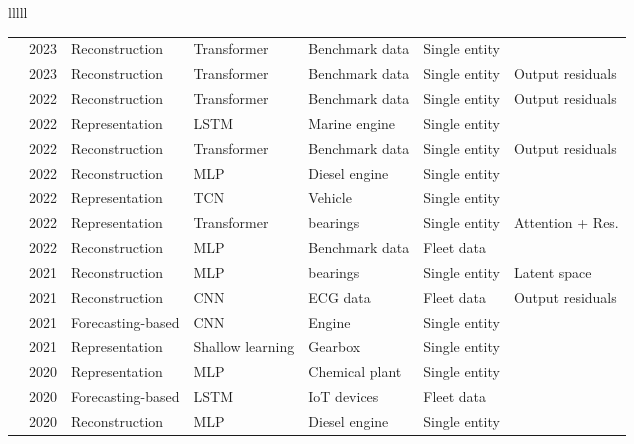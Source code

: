 \begin{landscape}
\begin{longtable}{lllll}
\begin{tabular}{lllllll}
\cite{liDCTGANDilatedConvolutional2023} & 2023 & Reconstruction & Transformer & Benchmark data & Single entity & \texttimes \\
\cite{wuDecomposeAutoTransformerTime2023} & 2023 & Reconstruction & Transformer & Benchmark data & Single entity & Output residuals \\
\cite{xuAnomalyTransformerTime2022} & 2022 & Reconstruction & Transformer & Benchmark data & Single entity & Output residuals \\
\cite{velasco-gallegoRADISRealtimeAnomaly2022} & 2022 & Representation & LSTM & Marine engine & Single entity & \texttimes \\
\cite{tuliTranADDeepTransformer2022} & 2022 & Reconstruction & Transformer & Benchmark data & Single entity & Output residuals \\
\cite{yuFastAdaptionMulti2022} & 2022 & Reconstruction & MLP & Diesel engine & Single entity & \texttimes \\
\cite{neupaneTemporalAnomalyDetection2022} & 2022 & Representation & TCN & Vehicle & Single entity & \texttimes \\
\cite{chiBearingFaultDiagnosis2022} & 2022 & Representation & Transformer & bearings & Single entity & Attention + Res. \\
\cite{gargEvaluationAnomalyDetection2022} & 2022 & Reconstruction & MLP & Benchmark data & Fleet data & \texttimes \\
\cite{arellano-espitiaDeepCompactClusteringBasedAnomaly2021} & 2021 & Reconstruction & MLP & bearings & Single entity & Latent space \\
\cite{thillTemporalConvolutionalAutoencoder2021} & 2021 & Reconstruction & CNN & ECG data & Fleet data & Output residuals \\
\cite{liuDeepAnomalyDetection2021} & 2021 & Forecasting-based & CNN & Engine & Single entity & \texttimes \\
\cite{huNovelVehicleGearbox2021} & 2021 & Representation & Shallow learning & Gearbox & Single entity & \texttimes \\
\cite{kimSemiSupervisedAutoencoderAuxiliary2020} & 2020 & Representation & MLP & Chemical plant & Single entity & \texttimes \\
\cite{minghuzhangDataDrivenAnomalyDetection2020} & 2020 & Forecasting-based & LSTM & IoT devices & Fleet data & \texttimes \\
\cite{ellefsenOnlineFaultDetection2020} & 2020 & Reconstruction & MLP & Diesel engine & Single entity & \texttimes \\

\end{tabular}
\end{longtable}
\end{landscape}
